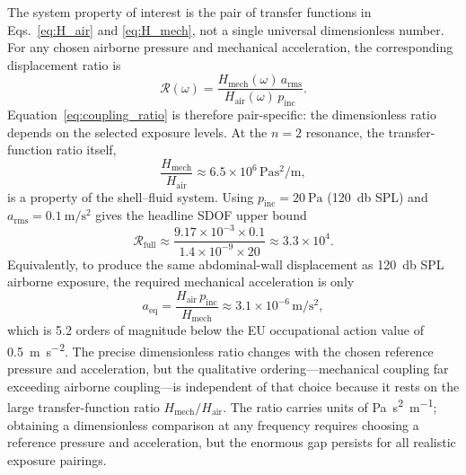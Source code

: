 The system property of interest is the pair of transfer functions in
Eqs.~\eqref{eq:H_air} and \eqref{eq:H_mech}, not a single universal
dimensionless number.  For any chosen airborne pressure and mechanical
acceleration, the corresponding displacement ratio is
\begin{equation}
  \mathcal{R}(\omega)
  = \frac{H_\mathrm{mech}(\omega)\,a_\mathrm{rms}}
         {H_\mathrm{air}(\omega)\,p_\mathrm{inc}}.
  \label{eq:coupling_ratio}
\end{equation}
Equation~\eqref{eq:coupling_ratio} is therefore pair-specific: the dimensionless
ratio depends on the selected exposure levels.  At the $n = 2$ resonance, the
transfer-function ratio itself,
\[
  \frac{H_\mathrm{mech}}{H_\mathrm{air}}
  \approx 6.5 \times 10^{6}\,\si{\pascal\second\squared\per\metre},
\]
is a property of the shell--fluid system.  Using
$p_\mathrm{inc} = \SI{20}{\pascal}$ (\SI{120}{\decibel} SPL) and
$a_\mathrm{rms} = \SI{0.1}{\metre\per\second\squared}$ gives the headline SDOF
upper bound
\[
  \mathcal{R}_\mathrm{full}
  \approx \frac{9.17 \times 10^{-3}\times 0.1}
                {1.4 \times 10^{-9}\times 20}
  \approx 3.3 \times 10^{4}.
\]
Equivalently, to produce the same abdominal-wall displacement as
\SI{120}{\decibel} SPL airborne exposure, the required mechanical acceleration
is only
\begin{equation}
  a_\mathrm{eq}
  = \frac{H_\mathrm{air}\,p_\mathrm{inc}}{H_\mathrm{mech}}
  \approx 3.1 \times 10^{-6}\,\si{\metre\per\second\squared},
  \label{eq:a_eq}
\end{equation}
which is 5.2 orders of magnitude below the EU occupational action value of
\SI{0.5}{\metre\per\second\squared}.  The precise dimensionless ratio changes
with the chosen reference pressure and acceleration, but the qualitative
ordering---mechanical coupling far exceeding airborne coupling---is independent
of that choice because it rests on the large transfer-function ratio
$H_\mathrm{mech}/H_\mathrm{air}$.  The ratio carries units of
\si{\pascal\second\squared\per\metre}; obtaining a dimensionless comparison at
any frequency requires choosing a reference pressure and acceleration, but the
enormous gap persists for all realistic exposure pairings.

